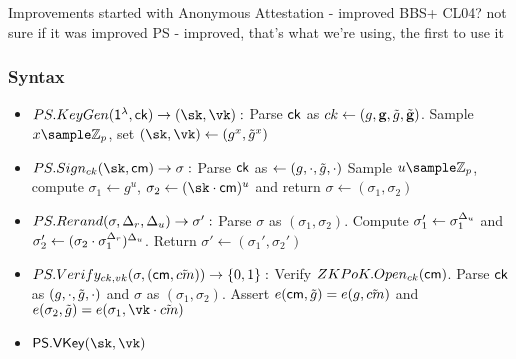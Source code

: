 Improvements started with
Anonymous Attestation - improved BBS+
CL04? not sure if it was improved
PS - improved, that's what we're using, the first to use it


















\subsubsection{Syntax}
\begin{itemize}
    \item $PS.KeyGen(\secparam, \ck) \to (\sk, \vk):$ Parse $\mathsf{ck}$ as $ck \gets (g, \textbf{g}, \tilde{g}, \tilde{\textbf{g}})$. Sample $x \sample \Zp$, set $(\sk, \vk) \gets (g^x, \tilg^x)$

    \item $PS.Sign_{ck}(\sk, \cm) \to \sigma:$ Parse $\mathsf{ck}$ as $\gets (g, \cdot, \tilde{g}, \cdot)$ Sample $u \sample \Zp$, compute $\sigma_1 \gets g^u$, $\sigma_2 \gets (\sk \cdot \cm)^u$
     and return $\sigma \gets (\sigma_1, \sigma_2)$

     \item $PS.Rerand(\sigma, \Delta_r, \Delta_u) \to \sigma': $ Parse $\sigma$ as $(\sigma_1, \sigma_2)$. Compute $\sigma_1' \gets \sigma_1^{\Delta_u}$ and $\sigma_2' \gets (\sigma_2 \cdot \sigma_1^{\Delta_r})^{\Delta_u}$. Return $\sigma' \gets (\sigma_1', \sigma_2')$

     \item $PS.Verify_{ck, vk}(\sigma, (\mathsf{cm}, \tilde{cm})) \to \{0,1\}: $ Verify $ZKPoK.Open_{ck}(\mathsf{cm})$. Parse $\mathsf{ck}$ as $(g, \cdot, \tilde{g}, \cdot)$ and $\sigma$ as $(\sigma_1, \sigma_2)$. Assert $e(\mathsf{cm}, \tilde{g}) = e(g, \tilde{cm})$ and $e(\sigma_2, \tilg) = e(\sigma_1, \vk \cdot \tilcm)$

     \item $\mathsf{PS.VKey}(\sk, \vk)$ 
     
\end{itemize}
